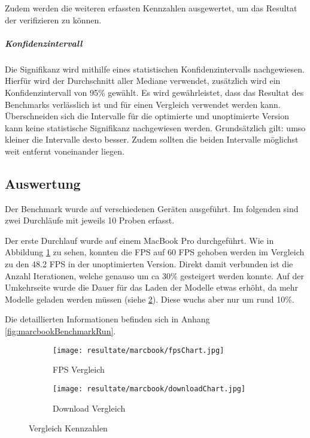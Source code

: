 Zudem werden die weiteren erfassten Kennzahlen ausgewertet, um das Resultat der  verifizieren zu können.

\subparagraph{Konfidenzintervall}
Die Signifikanz wird mithilfe eines statistischen Konfidenzintervalls nachgewiesen. Hierfür wird der Durchschnitt aller Mediane verwendet, zusätzlich wird ein Konfidenzintervall von 95\% gewählt. Es wird gewährleistet, dass das Resultat des Benchmarks verlässlich ist und für einen Vergleich verwendet werden kann. Überschneiden sich die Intervalle für die optimierte und unoptimierte Version kann keine statistische Signifikanz nachgewiesen werden. Grundsätzlich gilt: umso kleiner die Intervalle desto besser. Zudem sollten die beiden Intervalle möglichst weit entfernt voneinander liegen.

\subsection{Auswertung}
\label{chap:benchmarkResults}

Der Benchmark wurde auf verschiedenen Geräten ausgeführt. Im folgenden sind zwei Durchläufe mit jeweils 10 Proben erfasst.

Der erste Durchlauf wurde auf einem MacBook Pro durchgeführt. Wie in Abbildung \ref{fig:benchmarkFpsChartMarcbook} zu sehen, konnten die FPS auf 60 FPS gehoben werden im Vergleich zu den 48.2 FPS in der unoptimierten Version.
Direkt damit verbunden ist die Anzahl  Iterationen, welche genauso um ca 30\% gesteigert werden konnte. Auf der Umkehrseite wurde die Dauer für das Laden der Modelle etwas erhöht, da mehr Modelle geladen werden müssen (siehe \ref{fig:benchmarkDownloadChartMarcbook}). Diese wuchs aber nur um rund 10\%.

Die detaillierten Informationen befinden sich in Anhang \ref{fig:marcbookBenchmarkRun}.

\begin{figure}[H]
  \centering
  \begin{subfigure}{.49\textwidth}
    \centering
    \texttt{[image: resultate/marcbook/fpsChart.jpg]}
    \caption{FPS Vergleich}
    \label{fig:benchmarkFpsChartMarcbook}
  \end{subfigure}
  \begin{subfigure}{.49\textwidth}
    \centering
    \texttt{[image: resultate/marcbook/downloadChart.jpg]}
    \caption{Download Vergleich}
    \label{fig:benchmarkDownloadChartMarcbook}
  \end{subfigure}
  \caption{Vergleich Kennzahlen}
  \label{fig:benchmarkChartMarcbook}
\end{figure}

